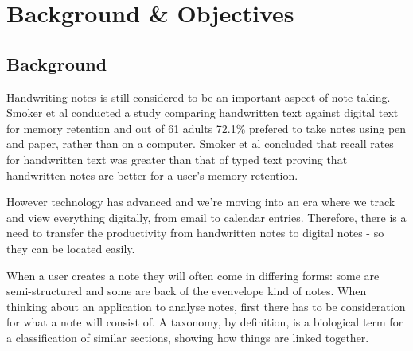 \chapter{Background \& Objectives}






\section{Background}
Handwriting notes is still considered to be an important aspect of note taking. Smoker et al \cite{citeulike:13988059} conducted a study comparing handwritten text against digital text for memory retention and out of 61 adults 72.1\% prefered to take notes using pen and paper, rather than on a computer. Smoker et al concluded that recall rates for handwritten text was greater than that of typed text proving that handwritten notes are better for a user's memory retention.

However technology has advanced and we're moving into an era where we track and view everything digitally, from email to calendar entries. Therefore, there is a need to transfer the productivity from handwritten notes to digital notes - so they can be located easily.


When a user creates a note they will often come in differing forms: some are semi-structured and some are back of the evenvelope kind of notes. When thinking about an application to analyse notes, first there has to be consideration for what a note will consist of. A taxonomy, by definition, is a biological term for a classification of similar sections, showing how things are linked together. 

